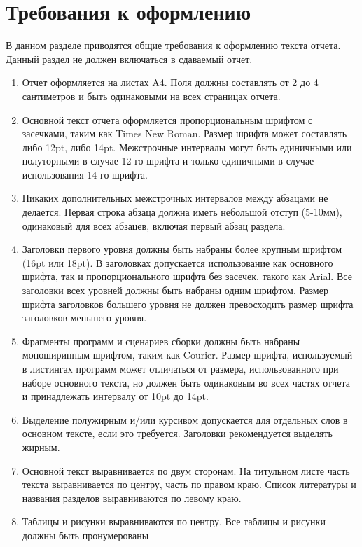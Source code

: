 \documentclass[a4paper,12pt,titlepage,finall]{article}
\begin{document}
\newpage

\section*{Требования к оформлению}

В данном разделе приводятся общие требования к оформлению текста отчета.
Данный раздел не должен включаться в сдаваемый отчет.

\begin{enumerate}
\item Отчет оформляется на листах A4. Поля должны составлять от 2 до 4
    сантиметров и быть одинаковыми на всех страницах отчета.
\item Основной текст отчета оформляется пропорциональным шрифтом с засечками,
    таким как Times New Roman. Размер шрифта может составлять либо 12pt, либо 14pt.
    Межстрочные интервалы могут быть единичными или полуторными в случае 12-го шрифта
    и только единичными в случае использования 14-го шрифта.
\item Никаких дополнительных межстрочных интервалов между абзацами не делается.
    Первая строка абзаца должна иметь небольшой отступ (5-10мм), одинаковый для
    всех абзацев, включая первый абзац раздела.
\item Заголовки первого уровня должны быть набраны более крупным шрифтом (16pt или 18pt).
    В заголовках допускается использование как основного шрифта, так и пропорционального
    шрифта без засечек, такого как Arial. Все заголовки всех уровней должны быть набраны
    одним шрифтом. Размер шрифта заголовков большего уровня не должен превосходить размер
    шрифта заголовков меньшего уровня.
\item Фрагменты программ и сценариев сборки должны быть набраны моноширинным шрифтом, таким
    как Courier. Размер шрифта, используемый в листингах программ может отличаться от размера,
    использованного при наборе основного текста, но должен быть одинаковым во всех частях
    отчета и принадлежать интервалу от 10pt до 14pt.
\item Выделение полужирным и/или курсивом допускается для отдельных слов в основном тексте,
    если это требуется. Заголовки рекомендуется выделять жирным.
\item Основной текст выравнивается по двум сторонам. На титульном листе часть текста
    выравнивается по центру, часть по правом краю. Список литературы и названия разделов 
    выравниваются по левому краю.
\item Таблицы и рисунки выравниваются по центру. Все таблицы и рисунки должны быть пронумерованы

\end{enumerate}
\end{document}
